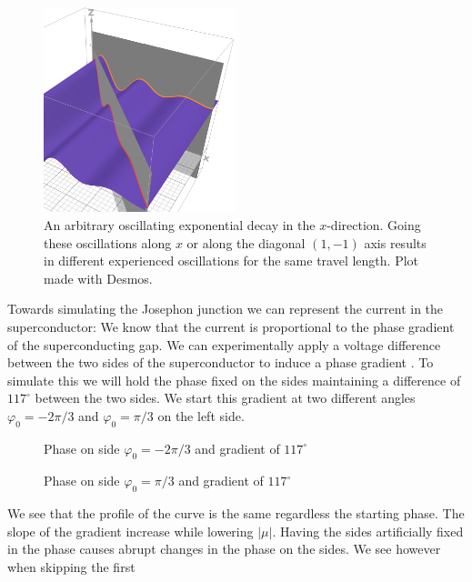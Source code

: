 \documentclass[..\main.tex]{subfile}
\begin{document}
\begin{figure}[H]
  \centering
  \includegraphics[width=0.5\textwidth]{Ressources/CooperPairsOrient.PNG}
  \caption{An arbitrary oscillating exponential decay in the $x$-direction. Going these oscillations along $x$ or along the diagonal $(1,-1)$ axis results in different
  experienced oscillations for the same travel length. Plot made with Desmos.}
\end{figure}
Towards simulating the Josephon junction we can represent the current in the superconductor:  
We know  that the current is proportional to the phase gradient of the superconducting gap.
We can experimentally apply a voltage difference between the two sides of the superconductor to induce a phase gradient .
To simulate this we will hold the phase fixed on the sides maintaining a difference of $117^{\circ}$ between the two sides.
We start this gradient at two different angles $\varphi_0 = -2\pi/3$ and $\varphi_0 = \pi/3$ on the left side.
\begin{figure}[H]
    
    \caption{Phase on side $\varphi_0 = -2\pi/3$ and gradient of $117^{\circ}$}
\end{figure}
\begin{figure}[H]
    
    \caption{Phase on side $\varphi_0 = \pi/3$ and gradient of $117^{\circ}$}
\end{figure}
We see that the profile of the curve is the same regardless the starting phase. The slope of the gradient increase while lowering $|\mu|$.
Having the sides artificially fixed in the phase causes abrupt changes in the phase on the sides. We see however when skipping the first
\end{document}
